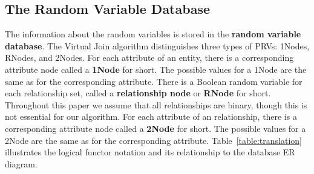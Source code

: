\documentclass{vldb}
\begin{document}
\subsection{The Random Variable Database}
The information about the random variables is stored in the \textbf{random variable database}.  
%
The Virtual Join algorithm distinguishes three types of PRVs: 1Nodes, RNodes, and 2Nodes. 
For each attribute of an entity, there is a corresponding attribute node called a \textbf{1Node} for short. The possible values for a 1Node are the same as for the corresponding attribute.  There is a Boolean random variable for each relationship set, called a \textbf{relationship node} or \textbf{RNode} for short.
Throughout this paper we assume that all relationships are binary, though this is not essential for our algorithm. 
For each attribute of an relationship, there is a corresponding attribute node called a \textbf{2Node} for short. The possible values for a 2Node are the same as for the corresponding attribute. 
Table~\ref{table:translation} illustrates %
the logical functor notation and its relationship to the database ER diagram. 
\end{document}

